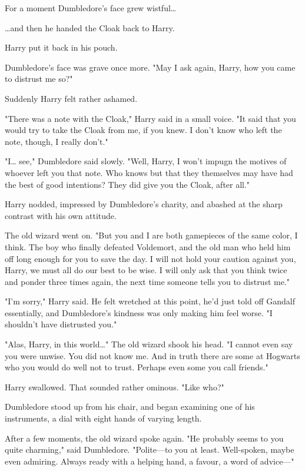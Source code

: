 For a moment Dumbledore's face grew wistful{\ldots}

{\ldots}and then he handed the Cloak back to Harry.

Harry put it back in his pouch.

Dumbledore's face was grave once more. "May I ask again, Harry, how you came to
distrust me so?"

Suddenly Harry felt rather ashamed.

"There was a note with the Cloak," Harry said in a small voice. "It said that
you would try to take the Cloak from me, if you knew. I don't know who left the
note, though, I really don't."

"I{\ldots} see," Dumbledore said slowly. "Well, Harry, I won't impugn the
motives of whoever left you that note. Who knows but that they themselves may
have had the best of good intentions? They did give you the Cloak, after all."

Harry nodded, impressed by Dumbledore's charity, and abashed at the sharp
contrast with his own attitude.

The old wizard went on. "But you and I are both gamepieces of the same color, I
think. The boy who finally defeated Voldemort, and the old man who held him off
long enough for you to save the day. I will not hold your caution against you,
Harry, we must all do our best to be wise. I will only ask that you think twice
and ponder three times again, the next time someone tells you to distrust me."

"I'm sorry," Harry said. He felt wretched at this point, he'd just told off
Gandalf essentially, and Dumbledore's kindness was only making him feel worse.
"I shouldn't have distrusted you."

"Alas, Harry, in this world{\ldots}" The old wizard shook his head. "I cannot
even say you were unwise. You did not know me. And in truth there are some at
Hogwarts who you would do well not to trust. Perhaps even some you call
friends."

Harry swallowed. That sounded rather ominous. "Like who?"

Dumbledore stood up from his chair, and began examining one of his instruments,
a dial with eight hands of varying length.

After a few moments, the old wizard spoke again. "He probably seems to you
quite charming," said Dumbledore. "Polite---to you at least. Well-spoken, maybe
even admiring. Always ready with a helping hand, a favour, a word of advice---"

